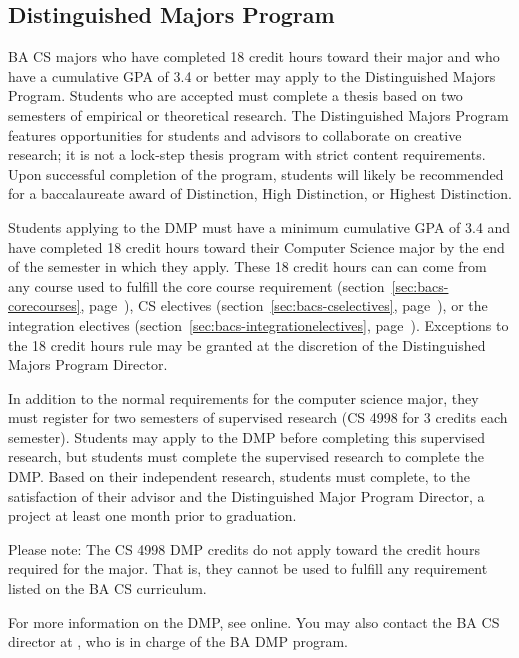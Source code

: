 \subsection{Distinguished Majors Program}
\label{sec:badmp}

BA CS majors who have completed 18 credit hours toward their major
and who have a cumulative GPA of 3.4 or better may apply to the
Distinguished Majors Program. Students who are accepted must complete
a thesis based on two semesters of empirical or theoretical
research. The Distinguished Majors Program features opportunities for
students and advisors to collaborate on creative research; it is not a
lock-step thesis program with strict content requirements. Upon
successful completion of the program, students will likely be
recommended for a baccalaureate award of Distinction, High
Distinction, or Highest Distinction.

Students applying to the DMP must have a minimum cumulative GPA of 3.4
and have completed 18 credit hours toward their Computer Science major
by the end of the semester in which they apply. These 18 credit hours
can can come from any course used to fulfill the core course
requirement (section~\ref{sec:bacs-corecourses},
page~\pageref{sec:bacs-corecourses}), CS electives
(section~\ref{sec:bacs-cselectives},
page~\pageref{sec:bacs-cselectives}), or the integration electives
(section~\ref{sec:bacs-integrationelectives},
page~\pageref{sec:bacs-integrationelectives}).
Exceptions to the 18 credit hours rule may be granted at the
discretion of the Distinguished Majors Program Director.

In addition to the normal requirements for the computer science major,
they must register for two semesters of supervised research (CS 4998
for 3 credits each semester). Students may apply to the DMP before
completing this supervised research, but students must complete the
supervised research to complete the DMP. Based on their independent
research, students must complete, to the satisfaction of their advisor
and the Distinguished Major Program Director, a project at least one
month prior to graduation.

Please note: The CS 4998 DMP credits do not apply toward the credit
hours required for the major. That is, they cannot be used to fulfill
any requirement listed on the BA CS curriculum.

For more information on the DMP, see
online\myurlFormatted{\bacsURLDMP}.
You may also contact the BA CS director at \bacsdirectoremail, who is
in charge of the BA DMP program.

